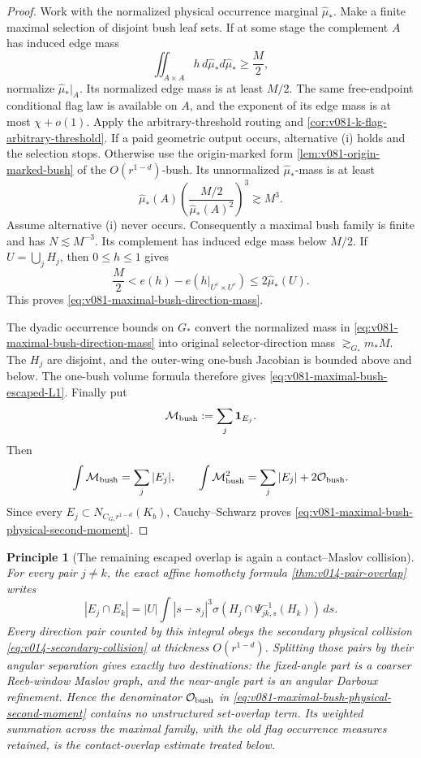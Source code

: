 \documentclass[10pt]{article}
\newtheorem{principle}[theorem]{Principle}
\begin{document}
\begin{proof}
Work with the normalized physical occurrence marginal
\(\widehat\mu_*\).  Make a finite maximal selection of disjoint bush leaf sets.  If at some stage
the complement \(A\) has induced edge mass
\[
\iint_{A\times A}h\,d\widehat\mu_*d\widehat\mu_*
\ge
\frac M2,
\]
normalize \(\widehat\mu_*|_A\).  Its normalized edge mass is at least \(M/2\).  The same
free-endpoint conditional flag law is available on \(A\), and the exponent of its edge mass is at
most \(\chi+o(1)\).  Apply the arbitrary-threshold routing and
\cref{cor:v081-k-flag-arbitrary-threshold}.  If a paid geometric output occurs, alternative
\textnormal{(i)} holds and the selection stops.  Otherwise use the origin-marked form
\cref{lem:v081-origin-marked-bush} of the \(O(r^{1-d})\)-bush.  Its unnormalized
\(\widehat\mu_*\)-mass is at least
\[
\widehat\mu_*(A)
\left(
\frac{M/2}{\widehat\mu_*(A)^2}
\right)^3
\gtrsim
M^3.
\]
Assume alternative \textnormal{(i)} never occurs.  Consequently a maximal bush family is finite
and has \(N\lesssim M^{-3}\).  Its complement has induced
edge mass below \(M/2\).  If \(U=\bigcup_jH_j\), then \(0\le h\le1\) gives
\[
\frac M2
<
e(h)-e(h|_{U^c\times U^c})
\le
2\widehat\mu_*(U).
\]
This proves \eqref{eq:v081-maximal-bush-direction-mass}.

The dyadic occurrence bounds on \(G_*\) convert the normalized mass in
\eqref{eq:v081-maximal-bush-direction-mass} into original selector-direction mass
\(\gtrsim_{G_*}m_*M\).  The \(H_j\) are disjoint, and the outer-wing one-bush Jacobian is bounded
above and below.  The one-bush volume formula therefore gives
\eqref{eq:v081-maximal-bush-escaped-L1}.  Finally put
\[
\mathcal M_{\rm bush}:=\sum_j\mathbf 1_{E_j}.
\]
Then
\[
\int\mathcal M_{\rm bush}=\sum_j|E_j|,
\qquad
\int\mathcal M_{\rm bush}^2
=
\sum_j|E_j|+2\mathcal O_{\rm bush}.
\]
Since every \(E_j\subset N_{C_{G_*}r^{1-d}}(K_b)\), Cauchy--Schwarz proves
\eqref{eq:v081-maximal-bush-physical-second-moment}.
\end{proof}

\begin{principle}[The remaining escaped overlap is again a contact--Maslov collision]
\label{pr:v081-bush-overlap-contact-return}
For every pair \(j\ne k\), the exact affine homothety formula
\cref{thm:v014-pair-overlap} writes
\[
|E_j\cap E_k|
=
|U|\int |s-s_j|^3
\sigma\!\left(H_j\cap\Psi_{jk,s}^{-1}(H_k)\right)\,ds.
\]
Every direction pair counted by this integral obeys the secondary physical collision
\eqref{eq:v014-secondary-collision} at thickness \(O(r^{1-d})\).  Splitting those pairs by their
angular separation gives exactly two destinations: the fixed-angle part is a coarser
Reeb-window Maslov graph, and the near-angle part is an angular Darboux refinement.  Hence the
denominator \(\mathcal O_{\rm bush}\) in
\eqref{eq:v081-maximal-bush-physical-second-moment} contains no unstructured set-overlap term.  Its
weighted summation across the maximal family, with the old flag occurrence measures retained, is
the contact-overlap estimate treated below.
\end{principle}
\end{document}
